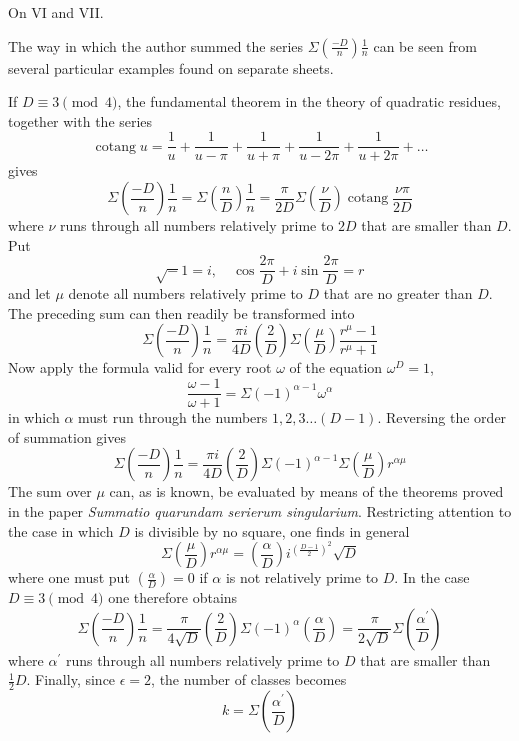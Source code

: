 \begin{center}\large On VI and VII.\end{center}

The way in which the author summed the series $\Sigma\left(\frac{-D}n\right)\frac1n$ can be seen from several particular examples found on separate sheets.

If $D\equiv3\pmod4$, the fundamental theorem in the theory of quadratic residues, together with the series
\[
\operatorname{cotang}u=\frac1u+\frac1{u-\pi}+\frac1{u+\pi}+\frac1{u-2\pi}+\frac1{u+2\pi}+\ldots
\]
gives
\[
\Sigma\left(\frac{-D}n\right)\frac1n=\Sigma\left(\frac nD\right)\frac1n=\frac\pi{2D}\Sigma\left(\frac\nu D\right)\operatorname{cotang}\frac{\nu\pi}{2D}
\]
where $\nu$ runs through all numbers relatively prime to $2D$ that are smaller than $D$. Put
\[
\surd-1=i,\quad\cos\frac{2\pi}D+i\sin\frac{2\pi}D=r
\]
and let $\mu$ denote all numbers relatively prime to $D$ that are no greater than $D$. The preceding sum can then readily be transformed into
\[
\Sigma\left(\frac{-D}n\right)\frac1n=\frac{\pi i}{4D}\left(\frac2D\right)\Sigma\left(\frac\mu D\right)\frac{r^\mu-1}{r^\mu+1}
\]
Now apply the formula valid for every root $\omega$ of the equation $\omega^D=1$,
\[
\frac{\omega-1}{\omega+1}=\Sigma(-1)^{\alpha-1}\omega^\alpha
\]
in which $\alpha$ must run through the numbers $1,2,3\ldots(D-1)$. Reversing the order of summation gives
\[
\Sigma\left(\frac{-D}n\right)\frac1n=\frac{\pi i}{4D}\left(\frac2D\right)\Sigma(-1)^{\alpha-1}\Sigma\left(\frac\mu D\right)r^{\alpha\mu}
\]
The sum over $\mu$ can, as is known, be evaluated by means of the theorems proved in the paper \emph{Summatio quarundam serierum singularium}. Restricting attention to the case in which $D$ is divisible by no square, one finds in general
\begingroup{}
\[
\Sigma\left(\frac\mu D\right)r^{\alpha\mu}=\left(\frac\alpha D\right)i^{\left(\frac{D-1}2\right)^2}\surd D
\]
\endgroup
where one must put $\left(\frac\alpha D\right)=0$ if $\alpha$ is not relatively prime to $D$. In the case $D\equiv3\pmod4$ one therefore obtains
\begingroup{}
\[
\Sigma\left(\frac{-D}n\right)\frac1n=\frac\pi{4\surd D}\left(\frac2D\right)\Sigma(-1)^\alpha\left(\frac\alpha D\right)=\frac\pi{2\surd D}\Sigma\left(\frac{\alpha^{\prime}}D\right)
\]
where $\alpha^{\prime}$ runs through all numbers relatively prime to $D$ that are smaller than $\frac12D$. Finally, since $\epsilon=2$, the number of classes becomes
\[
k=\Sigma\left(\frac{\alpha^{\prime}}D\right)
\]
\endgroup


